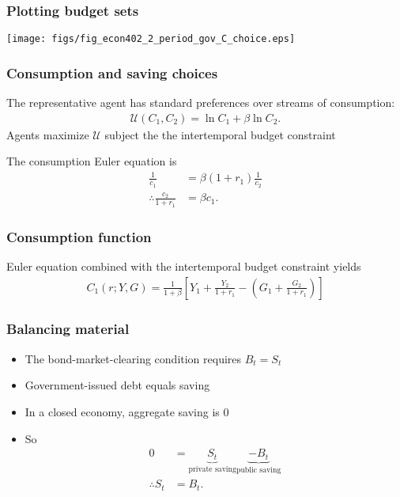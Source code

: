 \documentclass[presentation,dvipsnames]{beamer}
\begin{document}
\begin{frame}
\frametitle{Plotting budget sets}
\centerline{\texttt{[image: figs/fig\_econ402\_2\_period\_gov\_C\_choice.eps]}}
\end{frame}

\begin{frame}
\frametitle{Consumption and saving choices}
The representative agent has standard preferences over streams of consumption:
\begin{align*}
\mathcal{U}(C_{1},C_{2}) = \ln C_{1} + \beta \ln C_{2}.
\end{align*}
Agents maximize $\mathcal{U}$ subject the the intertemporal budget constraint 

\vspace{1em}

The consumption Euler equation is
\begin{align*}
\frac{1}{c_{1}} &= \beta (1+r_{1}) \frac{1}{c_{2}} \\
\therefore \frac{c_{2}}{1+r_{1}} &= \beta c_{1}.
\end{align*}
\end{frame}

\begin{frame}
\frametitle{Consumption function}
Euler equation combined with the intertemporal budget constraint yields
\begin{align*}
C_{1}(r;Y,G) = \frac{1}{1+\beta} \left[ Y_{1} + \frac{Y_{2}}{1+r_{1}} - \left( G_{1} + \frac{G_{2}}{1+r_{1}} \right) \right]
\end{align*}
\end{frame}

\begin{frame}
\frametitle{Balancing material}
\begin{itemize}[label={--}]
\item The bond-market-clearing condition requires $B_{t} = S_{t}$
\item Government-issued debt equals saving
\item In a closed economy, aggregate saving is $0$
\item So
\begin{align*}
0 &= \underbrace{S_{t}}_{\text{private saving}} \underbrace{- B_{t}}_{\text{public saving}} \\
\therefore S_{t} &= B_{t}.
\end{align*}
\end{itemize}
\end{frame}
\end{document}
